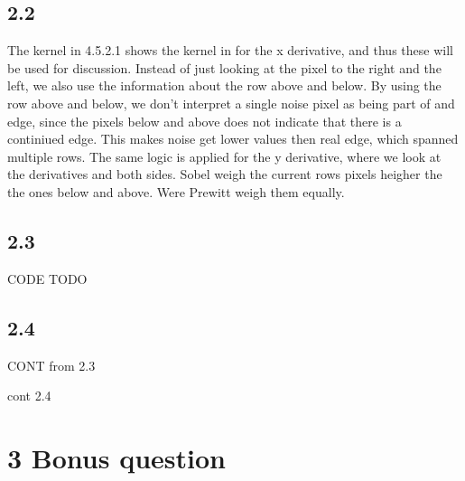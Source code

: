 \documentclass[11pt]{report}
\begin{document}
\subsection{2.2}

The kernel in 4.5.2.1 shows the kernel in for the x derivative, and thus these will be used for discussion. Instead of just looking at the pixel to the right and the left, we also use the information about the row above and below. By using the row above and below, we don't interpret a single noise pixel as being part of and edge, since the pixels below and above does not indicate that there is a continiued edge. This makes noise get lower values then real edge, which spanned multiple rows. The same logic is applied for the y derivative, where we look at the derivatives and both sides. Sobel weigh the current rows pixels heigher the the ones below and above. Were Prewitt weigh them equally.



\subsection{2.3}
CODE TODO

\subsection{2.4}
CONT from 2.3

cont 2.4

\section{3 Bonus question}
\end{document}
